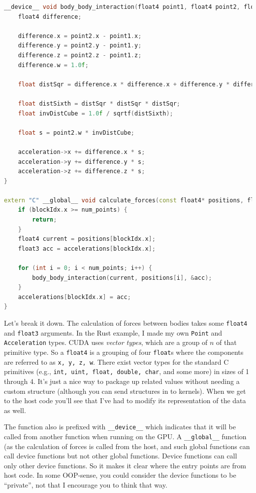 \documentclass[a4paper]{report}
\begin{document}
\begin{lstlisting}[language=C++]
__device__ void body_body_interaction(float4 point1, float4 point2, float3 *acceleration) {
    float4 difference;

    difference.x = point2.x - point1.x;
    difference.y = point2.y - point1.y;
    difference.z = point2.z - point1.z;
    difference.w = 1.0f;

    float distSqr = difference.x * difference.x + difference.y * difference.y + difference.z * difference.z + 1e-10;

    float distSixth = distSqr * distSqr * distSqr;
    float invDistCube = 1.0f / sqrtf(distSixth);

    float s = point2.w * invDistCube;

    acceleration->x += difference.x * s;
    acceleration->y += difference.y * s;
    acceleration->z += difference.z * s;
}

extern "C" __global__ void calculate_forces(const float4* positions, float3* accelerations, int num_points) {
    if (blockIdx.x >= num_points) {
        return;
    }
    float4 current = positions[blockIdx.x];
    float3 acc = accelerations[blockIdx.x];

    for (int i = 0; i < num_points; i++) {
        body_body_interaction(current, positions[i], &acc);
    }
    accelerations[blockIdx.x] = acc;
}
\end{lstlisting}

Let's break it down. The calculation of forces between bodies takes some \texttt{float4} and \texttt{float3} arguments. In the Rust example, I made my own \texttt{Point} and \texttt{Acceleration} types. CUDA uses \textit{vector types}, which are a group of $n$ of that primitive type. So a \texttt{float4} is a grouping of four \texttt{float}s where the components are referred to as \texttt{x, y, z, w}. There exist vector types for the standard C primitives (e.g., \texttt{int, uint, float, double, char}, and some more) in sizes of 1 through 4. It's just a nice way to package up related values without needing a custom structure (although you can send structures in to kernels). When we get to the host code you'll see that I've had to modify its representation of the data as well.

The function also is prefixed with \texttt{\_\_device\_\_} which indicates that it will be called from another function when running on the GPU. A \texttt{\_\_global\_\_} function (as the calculation of forces is called from the host, and such global functions can call device functions but not other global functions. Device functions can call only other device functions. So it makes it clear where the entry points are from host code. In some OOP-sense, you could consider the device functions to be ``private'', not that I encourage you to think that way.
\end{document}
